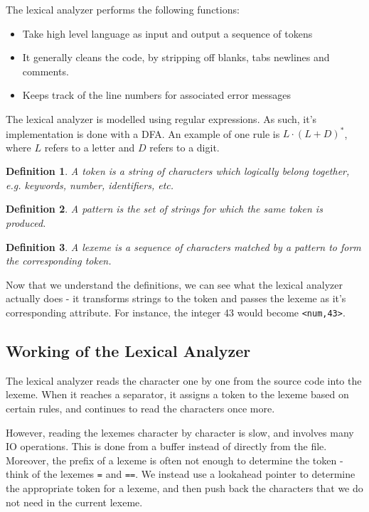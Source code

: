 \documentclass[12pt,letterpaper]{article}
\newtheorem{definition}{Definition}[section] %
\begin{document}
The lexical analyzer performs the following functions:

\begin{itemize}
  \item Take high level language as input and output a sequence of tokens
  \item It generally cleans the code, by stripping off blanks, tabs newlines and comments.
  \item Keeps track of the line numbers for associated error messages
\end{itemize}

The lexical analyzer is modelled using regular expressions. As such, it's implementation is done with a DFA. An example of one rule is $L \cdot (L+D)^*$, where $L$ refers to a letter and $D$ refers to a digit.

\begin{definition}
  A token is a string of characters which logically belong together, e.g. keywords, number, identifiers, etc.
\end{definition}

\begin{definition}
  A pattern is the set of strings for which the same token is produced.
\end{definition}

\begin{definition}
  A lexeme is a sequence of characters matched by a pattern to form the corresponding token.
\end{definition}

Now that we understand the definitions, we can see what the lexical analyzer actually does - it transforms strings to the token and passes the lexeme as it's corresponding attribute. For instance, the integer 43 would become \texttt{<num,43>}.

\subsection{Working of the Lexical Analyzer}

The lexical analyzer reads the character one by one from the source code into the lexeme. When it reaches a separator, it assigns a token to the lexeme based on certain rules, and continues to read the characters once more.

However, reading the lexemes character by character is slow, and involves many IO operations. This is done from a buffer instead of directly from the file. Moreover, the prefix of a lexeme is often not enough to determine the token - think of the lexemes \texttt{=} and \texttt{==}. We instead use a lookahead pointer to determine the appropriate token for a lexeme, and then push back the characters that we do not need in the current lexeme.
\end{document}
